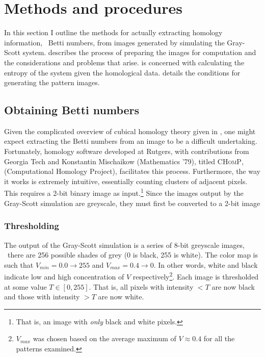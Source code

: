 \chapter{Methods and procedures} \label{ch:methods}

In this section I outline the methods for actually extracting homology information, \ie~Betti numbers, from images generated by simulating the Gray-Scott system.  describes the process of preparing the images for computation and the considerations and problems that arise.  is concerned with calculating the entropy of the system given the homological data.  details the conditions for generating the pattern images.

\section{Obtaining Betti numbers}

Given the complicated overview of cubical homology theory given in , one might expect extracting the Betti numbers from an image to be a difficult undertaking. Fortunately, homology software developed at Rutgers, with contributions from Georgia Tech and Konstantin Mischaikow (Mathematics '79), titled \textsc{CHomP}, (Computational Homology Project), facilitates this process. Furthermore, the way it works is extremely intuitive, essentially counting clusters of adjacent pixels. This requires a 2-bit binary image as input.\footnote{That is, an image with \emph{only} black and white pixels.} Since the images output by the Gray-Scott simulation are greyscale, they must first be converted to a 2-bit image

\subsection{Thresholding} \label{sect:thresholding}

The output of the Gray-Scott simulation is a series of 8-bit greyscale images, \ie~there are 256 possible shades of grey (0 is black, 255 is white). The color map is such that $V_{min} = 0.0 \rightarrow 255$ and $V_{max} = 0.4 \rightarrow 0$. In other words, white and black indicate low and high concentration of $V$ respectively\footnote{$V_{max}$ was chosen based on the average maximum of $V \approx 0.4$ for all the patterns examined.}. Each image is thresholded at some value $T \in [0,255]$. That is, all pixels with intensity $< T$ are now black and those with intensity $> T$ are now white.

